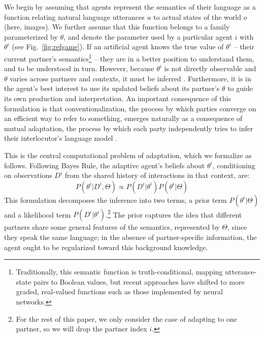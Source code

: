 \documentclass[11pt,a4paper]{article}
\begin{document}
We begin by assuming that agents represent the semantics of their language as a function relating natural language utterances $u$ to actual states of the world $o$ (here, images). 
We further assume that this function belongs to a family parameterized by $\theta$, and denote the parameter used by a particular agent $i$ with $\theta^i$ (see Fig.~\ref{fig:refgame}).
If an artificial agent knows the true value of $\theta^i$ -- their current partner's semantics\footnote{Traditionally, this semantic function is truth-conditional, mapping utterance-state pairs to Boolean values, but recent approaches have shifted to more graded, real-valued functions such as those implemented by neural networks.} -- they are in a better position to understand them, and to be understood in turn.
However, because $\theta^i$ is not directly observable and $\theta$ varies across partners and contexts, it must be inferred \cite{BergenLevyGoodman16_LexicalUncertainty}.
Furthermore, it is in the agent's best interest to use its updated beliefs about its partner's $\theta$ to guide its own production and interpretation.
An important consequence of this formulation is that conventionalization, the process by which parties converge on an efficient way to refer to something, emerges naturally as a consequence of mutual adaptation, the process by which each party independently tries to infer their interlocutor's language model \cite{SmithGoodmanFrank13_RecursivePragmaticReasoningNIPS,hawkins2020generalizing}.

This is the central computational problem of adaptation, which we formalize as follows.
Following Bayes Rule, the adaptive agent's beliefs about $\theta^i$, conditioning on observations $D^i$ from the shared history of interactions in that context, are:
\begin{equation}
	P(\theta^i | D^i, \Theta)  \propto P(D^i | \theta^i) P(\theta^i | \Theta)
	\label{eq:lexicon_update}
\end{equation}
This formulation decomposes the inference into two terms, a prior term $ P(\theta^i | \Theta)$ and a likelihood term $P(D^i | \theta^i)$.\footnote{For the rest of this paper, we only consider the case of adapting to one partner, so we will drop the partner index $i$.}
The prior captures the idea that different partners share some general features of the semantics, represented by $\Theta$, since they speak the same language; in the absence of partner-specific information, the agent ought to be regularized toward this background knowledge. 
\end{document}
